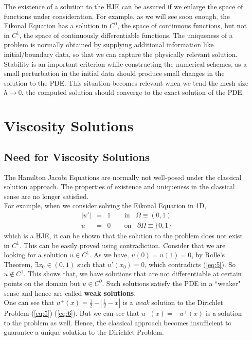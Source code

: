 \noindent
The existence of a solution to the HJE can be assured if we enlarge the space of functions under consideration. For example, as we will see soon enough, the Eikonal Equation has a solution in $C^0$, the space of continuous functions, but not in $C^1$, the space of continuously differentiable functions. The uniqueness of a problem is normally obtained by supplying additional information like initial/boundary data, so that we can capture the physically relevant solution. Stability is an important criterion while constructing the numerical schemes, as a small perturbation in the initial data should produce small changes in the solution to the PDE. This situation becomes relevant when we tend the mesh size $h \to 0$, the computed solution should converge to the exact solution of the PDE\cite{lax}.

\section{Viscosity Solutions}
\subsection{Need for Viscosity Solutions}
The Hamilton Jacobi Equations are normally not well-posed under the classical solution approach. The properties of existence and uniqueness in the classical sense are no longer satisfied.\\

\noindent
For example, when we consider solving the Eikonal Equation in 1D,
\begin{eqnarray}
  \lvert u' \rvert &=& 1 \qquad \text{in} \;\;\; \Omega \equiv (0,1)\label{eq:5}\\
  u &=& 0 \qquad \text{on} \;\;\; \partial \Omega \equiv \{0,1\}\label{eq:6}
\end{eqnarray}
which is a HJE, it can be shown that the solution to the problem does not exist in $C^1$. This can be easily proved using contradiction. Consider that we are looking for a solution $u \in C^1$. As we have, $u(0) = u(1) = 0$, by Rolle's Theorem, $\exists x_0 \in (0,1)$ such that $u'(x_0) = 0$, which contradicts (\ref{eq:5}). So $u \notin C^1$. This shows that, we have solutions that are not differentiable at certain points on the domain but $u \in C^0$. Such solutions satisfy the PDE in a ``weaker" sense and hence are called \textbf{weak solutions}.\\

\noindent
One can see that $u^+(x) = \frac{1}{2} - \left\lvert \frac{1}{2} - x\right\rvert$ is a \textit{weak} solution to the Dirichlet Problem (\ref{eq:5})-(\ref{eq:6}). But we can see that $u^-(x) = -u^+(x)$ is a solution to the problem as well. Hence, the classical approach becomes insufficient to guarantee a unique solution to the Dirichlet Problem.\\

